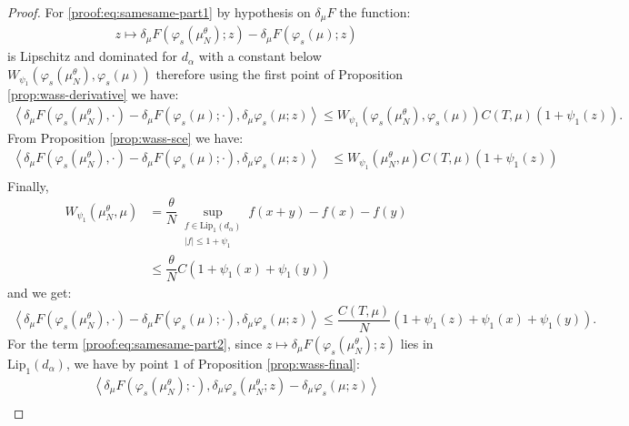\documentclass[11pt,a4paper]{article}
\newcommand{\brac}[1]{\left\langle#1\right\rangle}
\begin{document}
\begin{proof}
    For \eqref{proof:eq:samesame-part1} by hypothesis on $\delta_\mu F$ the function:
    \begin{align*}
        z \mapsto \delta_\mu F\left(\varphi_s\left(\mu^\theta_N\right);z\right) - \delta_\mu F(\varphi_s(\mu);z)
    \end{align*}
    is Lipschitz and dominated for $d_\alpha$ with a constant below $W_{\psi_1}\left(\varphi_s\left(\mu^\theta_N\right), \varphi_s\left(\mu\right) \right)$ therefore using the first point of Proposition \ref{prop:wass-derivative} we have:
    \begin{align*}
        \brac{\delta_\mu F\left(\varphi_s\left(\mu^\theta_N\right),\cdot\right) - \delta_\mu F(\varphi_s(\mu);\cdot),\delta_\mu \varphi_s (\mu;z)} \leq W_{\psi_1}\left(\varphi_s\left(\mu^\theta_N\right), \varphi_s\left(\mu\right) \right) C(T,\mu) (1 + \psi_1(z)).
    \end{align*}
    From Proposition \ref{prop:wass-sce} we have:
    \begin{align*}
        \brac{\delta_\mu F\left(\varphi_s\left(\mu^\theta_N\right),\cdot\right) - \delta_\mu F(\varphi_s(\mu);\cdot),\delta_\mu \varphi_s (\mu;z)} &\leq W_{\psi_1}\left(\mu^\theta_N,\mu\right) C(T,\mu) (1 + \psi_1(z)) \\
    \end{align*}
    Finally,
    \begin{align*}
        W_{\psi_1}\left(\mu^\theta_N,\mu\right) &= \dfrac{\theta}{N} \sup\limits_{\substack{f \in \text{Lip}_1(d_\alpha) \\ |f| \leq 1 + \psi_1}} f(x+y) - f(x) - f(y) \\
        &\leq \dfrac{\theta}{N} C(1 + \psi_1(x) + \psi_1(y))
    \end{align*}
    and we get:
    \begin{align*}
        \brac{\delta_\mu F\left(\varphi_s\left(\mu^\theta_N\right),\cdot\right) - \delta_\mu F(\varphi_s(\mu);\cdot),\delta_\mu \varphi_s (\mu;z)} \leq \dfrac{C(T,\mu)}{N}(1 + \psi_1(z) + \psi_1(x) + \psi_1(y)).
    \end{align*}
    For the term \eqref{proof:eq:samesame-part2}, since $z \mapsto \delta_\mu F\left(\varphi_s\left(\mu^\theta_N\right);z\right)$ lies in $\text{Lip}_1(d_\alpha)$, we have by point $1$ of Proposition \ref{prop:wass-final}:
    \begin{multline*}
        \brac{\delta_\mu F\left(\varphi_s\left(\mu^\theta_N\right);\cdot\right),\delta_\mu \varphi_s \left(\mu^\theta_N;z\right) - \delta_\mu \varphi_s (\mu;z)}\\

\end{multline*}
\end{proof}
\end{document}
